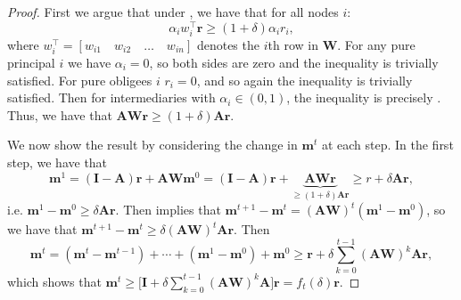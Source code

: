 \documentclass[10pt,a4paper]{amsart}
\newcommand{\A}{\mathbf{A}}
\newcommand{\I}{\mathbf{I}}
\newcommand{\W}{\mathbf{W}}
\newcommand{\meanvec}{\mathbf{\mean}}
\newcommand{\mean}{m}
\newcommand{\rvec}{\mathbf{r}}
\begin{document}
\begin{proof}
First we argue that under , we have that for all nodes $i$:
\[
\alpha_i w_i^\top \rvec \geq (1 + \delta) \alpha_i r_i,
\]
where $w_i^\top = [w_{i1}\quad w_{i2} \quad \dots \quad w_{in}]$ denotes the $i$th row in $\W$.
For any pure principal $i$ we have $\alpha_i = 0$, so both sides are zero and the inequality is trivially satisfied. For pure obligees $i$ $r_i = 0$, and so again the inequality is trivially satisfied. Then for intermediaries with $\alpha_i\in(0,1)$, the inequality is precisely .
Thus, we have that $\A \W \rvec \geq (1 + \delta) \A \rvec$.

We now show the result by considering the change in $\meanvec^t$ at each step.
In the first step, we have that
\begin{equation*}
    \meanvec^1 = (\I-\A)\rvec + \A\W\meanvec^0 
    = (\I-\A)\rvec + \underbrace{\A\W\rvec}_{\geq(1+\delta)\A\rvec} 
    \geq r + \delta\A\rvec,
\end{equation*}
i.e. $\meanvec^1-\meanvec^0\geq\delta\A\rvec$.
Then  implies that $\meanvec^{t+1}-\meanvec^t = (\A\W)^t(\meanvec^1-\meanvec^0)$, so we have that $\meanvec^{t+1}-\meanvec^t \geq \delta(\A\W)^t\A\rvec$.
Then
\begin{equation*}
    \meanvec^t = (\meanvec^t-\meanvec^{t-1})+\cdots+(\meanvec^1-\meanvec^0) + \meanvec^0
    \geq \rvec + \delta \sum_{k=0}^{t-1} (\A\W)^k\A\rvec,
\end{equation*}
which shows that $\meanvec^t \geq \Big[ \I + \delta \sum_{k=0}^{t-1} (\A\W)^k\A \Big] \rvec = f_t(\delta)\rvec$.
\end{proof}
\end{document}
